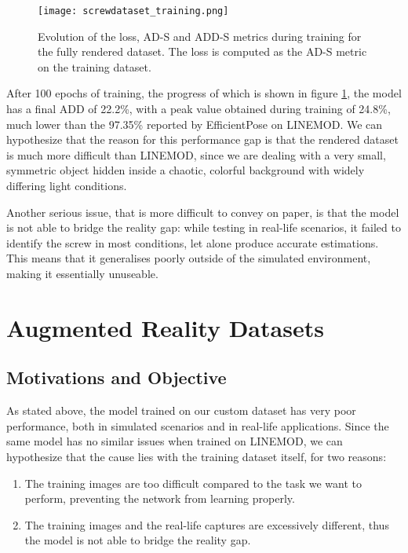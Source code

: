 \begin{figure}[ht]
    \texttt{[image: screwdataset\_training.png]}
    \caption{Evolution of the loss, AD-S and ADD-S metrics during training for the fully rendered dataset. The loss is computed as the AD-S metric on the training dataset.}
    \label{fig:screwdataset_training}
\end{figure}

After 100 epochs of training, the progress of which is shown in figure \ref{fig:screwdataset_training}, the model has a final ADD of 22.2\%, with a peak value obtained during training of 24.8\%, much lower than the 97.35\% reported by EfficientPose on LINEMOD. We can hypothesize that the reason for this performance gap is that the rendered dataset is much more difficult than LINEMOD, since we are dealing with a very small, symmetric object hidden inside a chaotic, colorful background with widely differing light conditions.

Another serious issue, that is more difficult to convey on paper, is that the model is not able to bridge the reality gap: while testing in real-life scenarios, it failed to identify the screw in most conditions, let alone produce accurate estimations. This means that it generalises poorly outside of the simulated environment, making it essentially unuseable.

\section{Augmented Reality Datasets}

\subsection{Motivations and Objective}

As stated above, the model trained on our custom dataset has very poor performance, both in simulated scenarios and in real-life applications. Since the same model has no similar issues when trained on LINEMOD, we can hypothesize that the cause lies with the training dataset itself, for two reasons:

\begin{enumerate}
    \item The training images are too difficult compared to the task we want to perform, preventing the network from learning properly.
    \item The training images and the real-life captures are excessively different, thus the model is not able to bridge the reality gap.
\end{enumerate}


